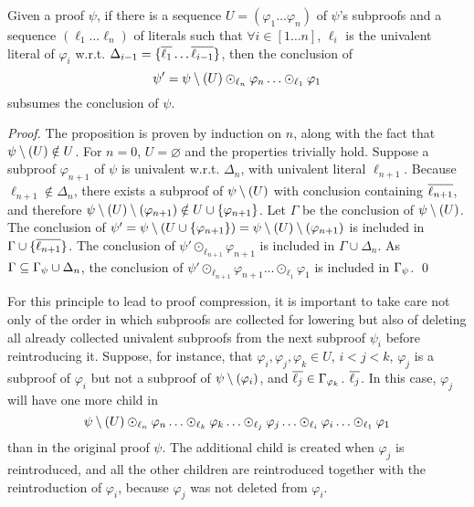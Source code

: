 \documentclass{llncs}
\begin{document}
\begin{proposition} \label{prop:LUniv}
Given a proof $\psi$, if 
there is a sequence $U = (\varphi_1 \ldots \varphi_n)$
of $\psi$'s subproofs and a sequence $(\ell_1 \ldots \ell_n)$ of literals such that $\forall i \in
[1 \ldots n]$, $\ell_i$ is the univalent literal of $\varphi_i$ w.r.t. $\Delta_{i-1} =
\{\overline{\ell_1} \ldots \overline{\ell_{i-1}}\}$, then the conclusion of $$ \psi' = \psi \setminus (U)
\odot_{\ell_n} \varphi_n \ldots \odot_{\ell_1} \varphi_1 $$ subsumes the conclusion of $\psi$.
\end{proposition}

\begin{proof}
The proposition is proven by induction on $n$, along with the fact that $\psi \setminus (U) \notin U$.
For $n = 0$, $U = \varnothing$ and the properties trivially hold. Suppose a subproof
$\varphi_{n+1}$ of $\psi$ is univalent w.r.t. $\Delta_n$, with univalent literal $\ell_{n+1}$.
Because $\ell_{n+1} \notin \Delta_n$, there exists a subproof of $\psi \setminus (U)$ with conclusion
containing $\overline{\ell_{n+1}}$, and therefore $\psi \setminus (U) \setminus (\varphi_{n+1}) \notin U \cup
\{\varphi_{n+1}\}$.  Let $\Gamma$ be the conclusion of $\psi \setminus (U)$. The conclusion of $ \psi' =
\psi \setminus (U \cup \{\varphi_{n+1}\}) = \psi \setminus (U) \setminus (\varphi_{n+1}) $ is included in $\Gamma \cup
\{\overline{\ell_{n+1}}\}$. The conclusion of $\psi' \odot_{\ell_{n+1}} \varphi_{n+1}$ is included in
$\Gamma \cup \Delta_n$. As $\Gamma \subseteq \Gamma_{\psi} \cup \Delta_n$, the conclusion of
$\psi' \odot_{\ell_{n+1}} \varphi_{n+1} \ldots \odot_{\ell_1} \varphi_1$ is included in
$\Gamma_{\psi}$. \qed
\end{proof}

For this principle to lead to proof compression, it is important to take care not only of the order in which subproofs are
collected for lowering but also of deleting all already collected univalent subproofs from the next subproof $\psi_i$ before reintroducing it. Suppose, for instance, that $\varphi_i, \varphi_j, \varphi_k \in U$, $i < j < k$, $\varphi_j$ is a subproof of $\varphi_i$ but not a subproof of $\psi \setminus (\varphi_i)$, and $\overline{\ell_j}
\in \Gamma_{\varphi_k}$. $\overline{\ell_j}$. In this
case, $\varphi_j$ will have one more child in $$\psi \setminus (U)
\odot_{\ell_n} \varphi_n \ldots \odot_{\ell_k} \varphi_k \ldots \odot_{\ell_j} \varphi_j \ldots \odot_{\ell_i} \varphi_i \ldots \odot_{\ell_1} \varphi_1 $$ than in the original proof $\psi$. The additional child is created when $\varphi_j$ is reintroduced, and all the other children are reintroduced together with the reintroduction of $\varphi_i$, because $\varphi_j$ was not deleted from $\varphi_i$.
\end{document}
